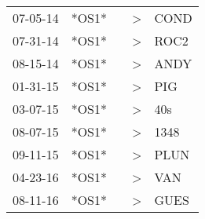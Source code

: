 \begin{supertabular}{p{0.07\textwidth}p{0.06\textwidth}p{0.02\textwidth}p{0.02\textwidth}p{0.06\textwidth}}
 07-05-14\textsuperscript{} &  *OS1* &   &  \textgreater &  COND\textsuperscript{} \\
 07-31-14\textsuperscript{} &  *OS1* &   &  \textgreater &  ROC2\textsuperscript{} \\
 08-15-14\textsuperscript{} &  *OS1* &   &  \textgreater &  ANDY\textsuperscript{} \\
 01-31-15\textsuperscript{} &  *OS1* &   &  \textgreater &   PIG\textsuperscript{} \\
 03-07-15\textsuperscript{} &  *OS1* &   &  \textgreater &   40s\textsuperscript{} \\
 08-07-15\textsuperscript{} &  *OS1* &   &  \textgreater &  1348\textsuperscript{} \\
 09-11-15\textsuperscript{} &  *OS1* &   &  \textgreater &  PLUN\textsuperscript{} \\
 04-23-16\textsuperscript{} &  *OS1* &   &  \textgreater &   VAN\textsuperscript{} \\
 08-11-16\textsuperscript{} &  *OS1* &   &  \textgreater &  GUES\textsuperscript{} \\
\end{supertabular}
